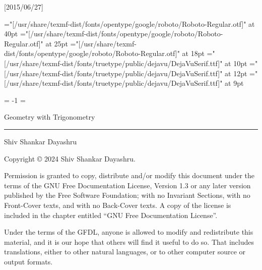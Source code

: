 

\protected{}
\protected{}
\protected{}
\protected{}


\beginpackages
  \usepackage{url}[2015/06/27]
  \usepackage[dvipsnames]{color}
\endpackages
\enablehyperlinks
{}

\font\titlefont="[/usr/share/texmf-dist/fonts/opentype/google/roboto/Roboto-Regular.otf]" at 40pt
\font\subtitlefont="[/usr/share/texmf-dist/fonts/opentype/google/roboto/Roboto-Regular.otf]" at 25pt
\font\authorfont="[/usr/share/texmf-dist/fonts/opentype/google/roboto/Roboto-Regular.otf]" at 18pt
\font\chaptitlefont="[/usr/share/texmf-dist/fonts/truetype/public/dejavu/DejaVuSerif.ttf]" at 10pt
\font\partfont="[/usr/share/texmf-dist/fonts/truetype/public/dejavu/DejaVuSerif.ttf]" at 12pt
\font\sectionfont="[/usr/share/texmf-dist/fonts/truetype/public/dejavu/DejaVuSerif.ttf]" at 9pt



\pageno = -1
\begingroup
  \nopagenumbers
  \headline={\kern-2in}
  ~~~
  \vskip 2cm
  \titlefont\centerline{\color{white}Geometry with
Trigonometry}
  \vskip 2mm
  {\color{white}\hrule}
  \vskip 2mm
  \subtitlefont{}
  \vskip 1.5cm
  \vfill
  \authorfont\color{white}Shiv Shankar Dayashru
  \color{black}
  \vfil
  \eject
\endgroup
\color{black}
\rewritetocfiletrue %
\completebooktrue
\edgetabsfalse
%
\noheadlinetrue
\sinkage

\bigskip

\bigskip

\vskip 2in
\noindent Copyright \copyright{} 2024 Shiv Shankar Dayashru.

\bigskip
\noindent Permission is granted to copy, distribute and/or modify this
document under the terms of the GNU Free Documentation License, Version
1.3 or any later version published by the Free Software Foundation; with
no Invariant Sections, with no Front-Cover texts, and with no Back-Cover
texts.  A copy of the license is included in the chapter entitled ``GNU
Free Documentation License''.

\medskip\noindent
Under the terms of the GFDL, anyone is allowed to modify and
redistribute this material, and it is our hope that others will find it
useful to do so.  That includes translations, either to other natural
languages, or to other computer source or output formats.

